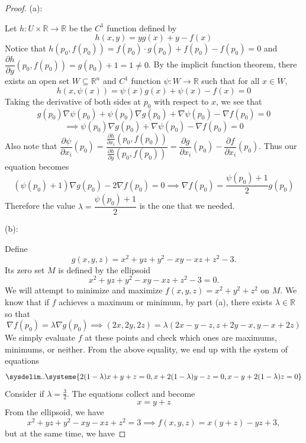 \documentclass{article}
\theoremstyle{plain} %
\numberwithin{thm}{section} %
\theoremstyle{definition}
\begin{document}
        \begin{proof}
            (a):
        
        Let \(h: U \times \mathbb{R} \to \mathbb{R}\) be the \(C^1\) function defined by
        \[
            h(x, y) = yg(x) + y - f(x)
        \]
        Notice that \(h(p_0, f(p_0)) = f(p_0) \cdot g(p_0) + f(p_0) - f(p_0) = 0\) and \(\dfrac{\partial h}{\partial y} (p_0, f(p_0)) = g(p_0) + 1 = 1 \neq 0\). By the implicit function theorem, there exists an open set \(W \subseteq \mathbb{R}^n\) and \(C^1\) function \(\psi : W \to \mathbb{R}\) such that for all \(x \in W\),
        \[
            h(x, \psi (x)) = \psi (x) g(x) + \psi (x) - f(x) = 0
        \]
        Taking the derivative of both sides at \(p_0\) with respect to \(x\), we see that
        \[
            g(p_0) \nabla \psi (p_0) + \psi (p_0) \nabla g(p_0) + \nabla \psi (p_0) - \nabla f(p_0) = 0
        \]
        \[
            \implies \psi (p_0) \nabla g(p_0) + \nabla \psi (p_0) - \nabla f(p_0) = 0
        \]
        Also note that \(\dfrac{\partial \psi}{\partial x_i}(p_0) = \dfrac{\frac{\partial h}{\partial x_i}(p_0, f(p_0))}{\frac{\partial h}{\partial y}(p_0, f(p_0))} = \dfrac{\partial g}{\partial x_i}(p_0) - \dfrac{\partial f}{\partial x_i}(p_0)\). Thus our equation becomes
        \[
            (\psi (p_0) + 1)\nabla g(p_0) - 2 \nabla f(p_0) = 0 \implies \nabla f(p_0) = \frac{\psi (p_0) + 1}{2} g(p_0)
        \]
        Therefore the value \(\lambda = \dfrac{\psi (p_0) + 1}{2}\) is the one that we needed.

        \medskip

        (b):

        Define
        \[
            g(x,y,z) = x^2 + yz + y^2 - xy - xz + z^2 - 3.
        \]
        Its zero set \(M\) is defined by the ellipsoid
        \[
            x^2 + yz + y^2 - xy - xz + z^2 - 3 = 0.
        \]
        We will attempt to minimize and maximize \(f(x,y,z) = x^2 + y^2 + z^2\) on \(M\). We know that if \(f\) achieves a maximum or minimum, by part (a), there exists \(\lambda \in \mathbb{R}\) so that
        \[
            \nabla f(p_0) = \lambda \nabla g(p_0) \implies (2x, 2y, 2z) = \lambda (2x - y - z, z + 2y - x, y - x + 2z)
        \]
        We simply evaluate \(f\) at these points and check which ones are maximums, minimums, or neither. From the above equality, we end up with the system of equations
        \begin{equation*}
            \sysdelim..
            \systeme{
                {2(1 - \lambda)}x + y + z = 0,
                x + {2(1 - \lambda)}y - z = 0,
                x - y + {2(1 - \lambda)}z = 0
            }
        \end{equation*}
        Consider if \(\lambda = \frac{3}{2}\). The equations collect and become
        \begin{equation*}
            x = y + z
        \end{equation*}
        From the ellipsoid, we have
        \[
            x^2 + yz + y^2 - xy - xz + z^2 = 3 \implies f(x,y,z) = x(y + z) - yz + 3,
        \]
        but at the same time, we have


\end{proof}
\end{document}
